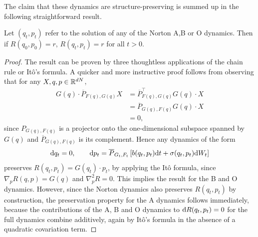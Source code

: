 The claim that these dynamics are structure-preserving is summed up in the following straightforward result.
\begin{lemma}
    Let $(q_t,p_t)$ refer to the solution of any of the Norton A,B or O dynamics. Then if $R(q_0,p_0)=r$, $R(q_t,p_t)=r$ for all $t>0$.
\end{lemma}
\begin{proof}
    The result can be proven by three thoughtless applications of the chain rule or Itô's formula.
    A quicker and more instructive proof follows from observing that for any $X,q,p\in \mathbb{R}^{dN}$, 
    \begin{align*}
        G(q) \cdot \overline{P}_{F(q),G(q)} X &= \overline{P}_{F(q),G(q)}^{\intercal}G(q)\cdot X\\
        &=\overline{P}_{G(q),F(q)}G(q)\cdot X\\
        &=0,
    \end{align*}
    since $P_{G(q),F(q)}$ is a projector onto the one-dimensional subspace spanned by $G(q)$ and $\overline{P}_{G(q),F(q)}$ is its complement. Hence any dynamics of the form 
    \[\mathrm{d} q_t =0,\qquad \mathrm{d} p_t = \overline{P}_{G_t,F_t}\left[b(q_t,p_t)\mathrm{d} t +\sigma(q_t,p_t)\mathrm{d} W_t\right]\]
    preserves $R(q_t,p_t)=G(q_t)\cdot p_t$, by applying the Itô formula, since $\nabla_p R(q,p)=G(q)$ and $\nabla_p^2 R=0$.
    This implies the result for the B and O dynamics. However, since the Norton dynamics also preserves $R(q_t,p_t)$ by construction, 
    the preservation property for the A dynamics follows immediately, because the contributions of the A, B and O dynamics to $\mathrm{d} R(q_t,p_t)=0$ for the full dynamics combine additively, again by Itô's formula in the absence of a quadratic covariation term.
\end{proof}

